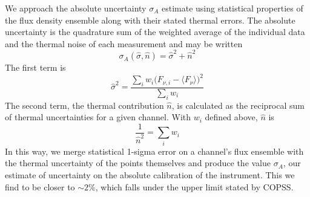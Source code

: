 \documentclass{article}
\begin{document}
	We approach the absolute uncertainty $\sigma_{A}$ estimate using statistical properties of the flux density ensemble along with their stated thermal errors.  The absolute uncertainty is the quadrature  sum of the weighted average of the individual data and the thermal noise of each measurement and may be written
	$$\sigma_{A}(\hat{\sigma}, \hat{n}) = \hat{\sigma}^{2} + \hat{n}^{2}$$
The first term is 
		$$\hat{\sigma}^{2} = \frac{\sum_{i} w_{i} \big( F_{\nu,i} - \langle F_{\nu} \rangle \big)^{2} }{\sum_{i} w_{i}}$$
	The second term, the thermal contribution $\hat{n}$, is calculated as the reciprocal sum of thermal uncertainties for a given channel.
	With $w_{i}$ defined above, $\hat{n}$ is
	$$ \frac{1}{\hat{n}^{2}} = \sum_{i} w_{i} $$
	In this way, we merge statistical 1-sigma error on a channel's flux ensemble with the thermal uncertainty of the points themselves and produce the value $\sigma_{A}$, our estimate of uncertainty on the absolute calibration of the instrument.
	This we find to be closer to $\sim2\%$, which falls under the upper limit stated by COPSS.
\end{document}
